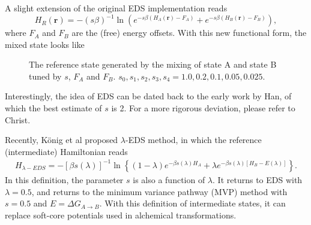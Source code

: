 A slight extension of the original EDS implementation reads
\begin{equation}
	H_R(\mathbf{r})=-\left(s\beta\right)^{-1}\ln{\left(e^{-s\beta (H_A(\mathbf{r})-F_A)}+e^{-s\beta (H_B(\mathbf{r})-F_B)}\right)},
	\label{Eq:ES:EDS:H_Rext}
\end{equation}
where $F_A$ and $F_B$ are the (free) energy offsets. With this new functional form, the mixed state looks like
\begin{figure}[htbp]
	\centering
	\caption{The reference state generated by the mixing of state A and state B tuned by $s$, $F_A$ and $F_B$. $s_0, s_1, s_2, s_3, s_4 = 1.0, 0.2, 0.1, 0.05, 0.025$.}\label{Fig:ES:EDS_ext}
\end{figure}

Interestingly, the idea of EDS can be dated back to the early work by Han\cite{HanPRA1992}, of which the best estimate of $s$ is 2. For a more rigorous deviation, please refer to Christ.\cite{ChristJCP2008}

Recently, K\"onig et al proposed $\lambda$-EDS method\cite{KonigJCIM2020}, in which the reference (intermediate) Hamiltonian reads
\begin{align}
	H_{\lambda-EDS}=-[\beta s(\lambda)]^{-1}\ln\left\{(1-\lambda)e^{-\beta s(\lambda)H_A}+\lambda e^{-\beta s(\lambda)[H_B-E(\lambda)]}\right\}.
\end{align}
In this definition, the parameter $s$ is also a function of $\lambda$. It returns to EDS with $\lambda=0.5$, and returns to the minimum variance pathway (MVP) method\cite{BlondelJCC2004} with $s=0.5$ and $E=\Delta G_{A\rightarrow B}$. With this definition of intermediate states, it can replace soft-core potentials\cite{ZachariasJCP1994} used in alchemical transformations.
